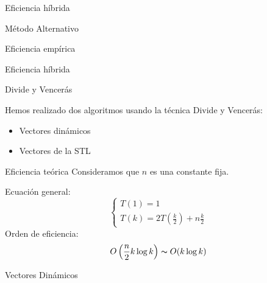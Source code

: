 \documentclass[spanish]{beamer}
\begin{document}
\begin{frame}{Eficiencia híbrida}
  \fontsize{8pt}{7.2}\selectfont
	\begin{center}
	\resizebox*{11cm}{!}{
		
	}
	\end{center}
\end{frame}

\begin{frame}{Método Alternativo}
	
\end{frame}

\begin{frame}{Eficiencia empírica}
	\begin{center}
		\resizebox*{11cm}{!}{
			}
	\end{center}
\end{frame}

\begin{frame}{Eficiencia híbrida}
  \fontsize{8pt}{7.2}\selectfont
	\begin{center}
	\resizebox*{11cm}{!}{
		
	}
	\end{center}
\end{frame}

\begin{frame}{Divide y Vencerás}

	Hemos realizado dos algoritmos usando la técnica Divide y Vencerás:
	\begin{itemize}
		\item Vectores dinámicos
		\item Vectores de la STL
	\end{itemize}
\end{frame}

\begin{frame}{Eficiencia teórica}
    \vspace{-1em}
    Consideramos que $n$ es una constante fija.
    
    \vskip 1cm 
	Ecuación general: $$ \begin{cases} T(1) = 1\\ T(k) = 2T\left(\frac{k}{2}\right) + n\frac{k}{2} \end{cases} $$
	Orden de eficiencia: $$ O\left(\frac{n}{2}k\log k \right) \thicksim O(k\log k) $$
\end{frame}

\begin{frame}{Vectores Dinámicos}

	
\end{frame}
\end{document}
